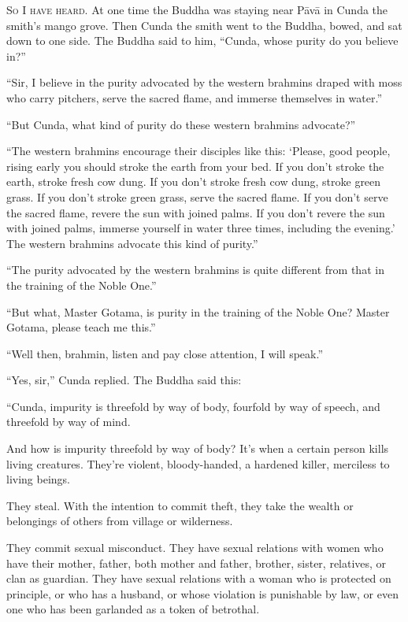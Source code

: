 \documentclass[12pt,openany]{book}%
\newcommand*{\scevam}[1]{\textsc{#1}}
\begin{document}
\scevam{So I have heard. }At one time the Buddha was staying near \textsanskrit{Pāvā} in Cunda the smith’s mango grove. Then Cunda the smith went to the Buddha, bowed, and sat down to one side. The Buddha said to him, “Cunda, whose purity do you believe in?” 

“Sir, I believe in the purity advocated by the western brahmins draped with moss who carry pitchers, serve the sacred flame, and immerse themselves in water.” 

“But Cunda, what kind of purity do these western brahmins advocate?” 

“The western brahmins encourage their disciples like this: ‘Please, good people, rising early you should stroke the earth from your bed. If you don’t stroke the earth, stroke fresh cow dung. If you don’t stroke fresh cow dung, stroke green grass. If you don’t stroke green grass, serve the sacred flame. If you don’t serve the sacred flame, revere the sun with joined palms. If you don’t revere the sun with joined palms, immerse yourself in water three times, including the evening.’ The western brahmins advocate this kind of purity.” 

“The purity advocated by the western brahmins is quite different from that in the training of the Noble One.” 

“But what, Master Gotama, is purity in the training of the Noble One? Master Gotama, please teach me this.” 

“Well then, brahmin, listen and pay close attention, I will speak.” 

“Yes, sir,” Cunda replied. The Buddha said this: 

“Cunda, impurity is threefold by way of body, fourfold by way of speech, and threefold by way of mind. 

And how is impurity threefold by way of body? It’s when a certain person kills living creatures. They’re violent, bloody-handed, a hardened killer, merciless to living beings. 

They steal. With the intention to commit theft, they take the wealth or belongings of others from village or wilderness. 

They commit sexual misconduct. They have sexual relations with women who have their mother, father, both mother and father, brother, sister, relatives, or clan as guardian. They have sexual relations with a woman who is protected on principle, or who has a husband, or whose violation is punishable by law, or even one who has been garlanded as a token of betrothal. 
\end{document}
